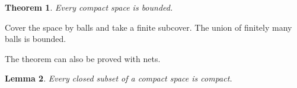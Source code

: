 \documentclass{amsart}
\newtheorem{theorem}{Theorem}
\newtheorem{lemma}[theorem]{Lemma}
\begin{document}
\begin{theorem} Every compact space is bounded. \end{theorem}
\proof Cover the space by balls and take a finite subcover.
%
%
The union of finitely many balls is bounded.


The theorem can also be proved with nets.
\begin{lemma} Every closed subset of a compact space is compact. \end{lemma}
\end{document}
